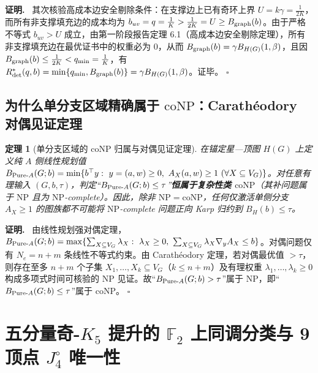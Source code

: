 \documentclass[11pt,a4paper]{ctexart}
\newtheorem{theorem}{定理}[section]
\theoremstyle{definition}
\newenvironment{proofcn}{\par\noindent\textbf{证明.}\ }{\hfill$\square$\par}
\newcommand{\FF}{\mathbb F}
\newcommand{\1}{\boldsymbol 1}
\newcommand{\0}{\boldsymbol 0}
\newcommand{\bgraph}{B_{\rm graph}}
\begin{document}
\begin{proofcn}
其次核验高成本边安全剔除条件：在支撑边上已有奇环上界 $U=k\gamma=\frac{1}{2K}$，而所有非支撑填充边的成本均为 $b_{uv}=q=\frac{1}{K}> \frac{1}{2K}=U\ge \bgraph(b)$。由于严格不等式 $b_{uv}>U$ 成立，由第一阶段报告定理 6.1（高成本边安全剔除定理），所有非支撑填充边在最优证书中的权重必为 $0$，从而 $\bgraph(b)=\gamma B_{H(G)}(1,\beta)$，且因 $\bgraph(b)\le \frac{1}{2K}<q_{\min}=\frac{1}{K}$，有 $R_{\rm det}^*(q,b)=\min\{q_{\min},\bgraph(b)\}=\gamma B_{H(G)}(1,\beta)$。证毕。
\end{proofcn}

\subsection{为什么单分支区域精确属于 $\mathrm{coNP}$：Carath\'eodory 对偶见证定理}
\begin{theorem}[单分支区域的 $\mathrm{coNP}$ 归属与对偶见证定理]\label{thm:conp_barrier}
在锚定星—顶图 $H(G)$ 上定义纯 $A$ 侧线性规划值 $B_{\text{\rm Pure-}A}(G;b)=\min\{b^\top y:\ y=(a,w)\ge 0,\ A_X(a,w)\ge 1\ (\forall X\subseteq V_G)\}$。对任意有理输入 $(G,b,\tau)$，判定“$B_{\text{\rm Pure-}A}(G;b)\le \tau$”\textbf{恒属于复杂性类 $\mathrm{coNP}$}（其补问题属于 $\mathrm{NP}$ 且为 $\mathrm{NP}$-complete）。因此，除非 $\mathrm{NP}=\mathrm{coNP}$，任何仅激活单侧分支 $A_X\ge 1$ 的图族都不可能将 $\mathrm{NP}$-complete 问题正向 Karp 归约到 $B_H(b)\le\tau$。
\end{theorem}
\begin{proofcn}
由线性规划强对偶定理，$B_{\text{\rm Pure-}A}(G;b) = \max\{\sum_{X\subseteq V_G}\lambda_X:\ \lambda_X\ge 0,\ \sum_{X\subseteq V_G}\lambda_X \nabla_y A_X\le b\}$。对偶问题仅有 $N_e=n+m$ 条线性不等式约束。由 Carath\'eodory 定理，若对偶最优值 $>\tau$，则存在至多 $n+m$ 个子集 $X_1,\dots,X_k\subseteq V_G$（$k\le n+m$）及有理权重 $\lambda_1,\dots,\lambda_k\ge 0$ 构成多项式时间可核验的 $\mathrm{NP}$ 见证。故“$B_{\text{\rm Pure-}A}(G;b)>\tau$”属于 $\mathrm{NP}$，即“$B_{\text{\rm Pure-}A}(G;b)\le\tau$”属于 $\mathrm{coNP}$。
\end{proofcn}

\section{五分量奇-$K_5$ 提升的 $\FF_2$ 上同调分类与 9 顶点 $J_4^\circ$ 唯一性}
\end{document}
